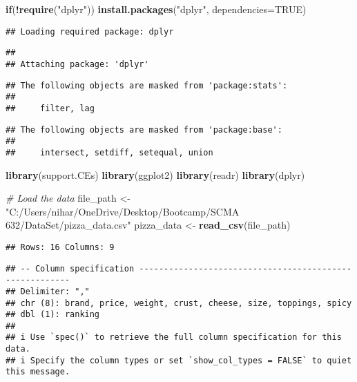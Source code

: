 \documentclass[
]{article}
\newenvironment{Shaded}{\begin{snugshade}}{\end{snugshade}}
\newcommand{\AttributeTok}[1]{\textcolor[rgb]{0.13,0.29,0.53}{#1}}
\newcommand{\CommentTok}[1]{\textcolor[rgb]{0.56,0.35,0.01}{\textit{#1}}}
\newcommand{\ConstantTok}[1]{\textcolor[rgb]{0.56,0.35,0.01}{#1}}
\newcommand{\ControlFlowTok}[1]{\textcolor[rgb]{0.13,0.29,0.53}{\textbf{#1}}}
\newcommand{\FunctionTok}[1]{\textcolor[rgb]{0.13,0.29,0.53}{\textbf{#1}}}
\newcommand{\NormalTok}[1]{#1}
\newcommand{\OtherTok}[1]{\textcolor[rgb]{0.56,0.35,0.01}{#1}}
\newcommand{\SpecialCharTok}[1]{\textcolor[rgb]{0.81,0.36,0.00}{\textbf{#1}}}
\newcommand{\StringTok}[1]{\textcolor[rgb]{0.31,0.60,0.02}{#1}}
\begin{document}
\begin{Shaded}
\begin{Highlighting}[]
\ControlFlowTok{if}\NormalTok{(}\SpecialCharTok{!}\FunctionTok{require}\NormalTok{(}\StringTok{"dplyr"}\NormalTok{)) }\FunctionTok{install.packages}\NormalTok{(}\StringTok{"dplyr"}\NormalTok{, }\AttributeTok{dependencies=}\ConstantTok{TRUE}\NormalTok{)}
\end{Highlighting}
\end{Shaded}

\begin{verbatim}
## Loading required package: dplyr
\end{verbatim}

\begin{verbatim}
## 
## Attaching package: 'dplyr'
\end{verbatim}

\begin{verbatim}
## The following objects are masked from 'package:stats':
## 
##     filter, lag
\end{verbatim}

\begin{verbatim}
## The following objects are masked from 'package:base':
## 
##     intersect, setdiff, setequal, union
\end{verbatim}

\begin{Shaded}
\begin{Highlighting}[]
\FunctionTok{library}\NormalTok{(support.CEs)}
\FunctionTok{library}\NormalTok{(ggplot2)}
\FunctionTok{library}\NormalTok{(readr)}
\FunctionTok{library}\NormalTok{(dplyr)}

\CommentTok{\# Load the data}
\NormalTok{file\_path }\OtherTok{\textless{}{-}} \StringTok{"C:/Users/nihar/OneDrive/Desktop/Bootcamp/SCMA 632/DataSet/pizza\_data.csv"}
\NormalTok{pizza\_data }\OtherTok{\textless{}{-}} \FunctionTok{read\_csv}\NormalTok{(file\_path)}
\end{Highlighting}
\end{Shaded}

\begin{verbatim}
## Rows: 16 Columns: 9
\end{verbatim}

\begin{verbatim}
## -- Column specification --------------------------------------------------------
## Delimiter: ","
## chr (8): brand, price, weight, crust, cheese, size, toppings, spicy
## dbl (1): ranking
## 
## i Use `spec()` to retrieve the full column specification for this data.
## i Specify the column types or set `show_col_types = FALSE` to quiet this message.
\end{verbatim}
\end{document}
